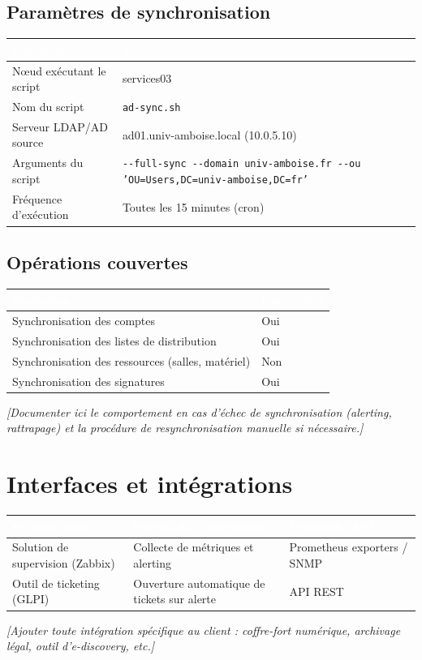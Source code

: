 \documentclass[11pt,a4paper]{report}
\newcommand{\placeholder}[1]{\textit{\textcolor{placeholdercol}{[#1]}}\par\vspace{4pt}}
\newcommand{\tblhead}[1]{\textcolor{white}{\textbf{#1}}}
\begin{document}
\section{Paramètres de synchronisation}
\begin{longtable}{|p{5.5cm}|p{7.5cm}|}
\hline
\rowcolor{primary}\tblhead{Paramètre} & \tblhead{Valeur} \\
\hline
\endhead
Nœud exécutant le script & services03 \\
\hline
Nom du script & \texttt{ad-\allowbreak{}sync.\allowbreak{}sh } \\
\hline
Serveur LDAP/AD source & ad01.\allowbreak{}univ-\allowbreak{}amboise.\allowbreak{}local (10.\allowbreak{}0.\allowbreak{}5.\allowbreak{}10) \\
\hline
Arguments du script & \texttt{-\allowbreak{}-\allowbreak{}full-\allowbreak{}sync -\allowbreak{}-\allowbreak{}domain univ-\allowbreak{}amboise.\allowbreak{}fr -\allowbreak{}-\allowbreak{}ou 'OU=Users,DC=univ-\allowbreak{}amboise,DC=fr' } \\
\hline
Fréquence d'exécution & Toutes les 15 minutes (cron) \\
\hline
\end{longtable}

\section{Opérations couvertes}
\begin{longtable}{|p{9cm}|p{4cm}|}
\hline
\rowcolor{primary}\tblhead{Opération} & \tblhead{Couverte ?} \\
\hline
\endhead
Synchronisation des comptes & Oui \\
\hline
Synchronisation des listes de distribution & Oui \\
\hline
Synchronisation des ressources (salles, matériel) & Non \\
\hline
Synchronisation des signatures & Oui \\
\hline
\end{longtable}
\placeholder{Documenter ici le comportement en cas d'échec de synchronisation (alerting, rattrapage) et la procédure de resynchronisation manuelle si nécessaire.}

\chapter{Interfaces et intégrations}
\begin{longtable}{|p{4.5cm}|p{4.5cm}|p{3.5cm}|}
\hline
\rowcolor{primary}\tblhead{Système tiers} & \tblhead{Nature de l'intégration} & \tblhead{Protocole/API} \\
\hline
\endhead
Solution de supervision (Zabbix) & Collecte de métriques et alerting & Prometheus exporters / SNMP \\
\hline
Outil de ticketing (GLPI) & Ouverture automatique de tickets sur alerte & API REST \\
\hline
\end{longtable}
\placeholder{Ajouter toute intégration spécifique au client : coffre-fort numérique, archivage légal, outil d'e-discovery, etc.}
\end{document}
